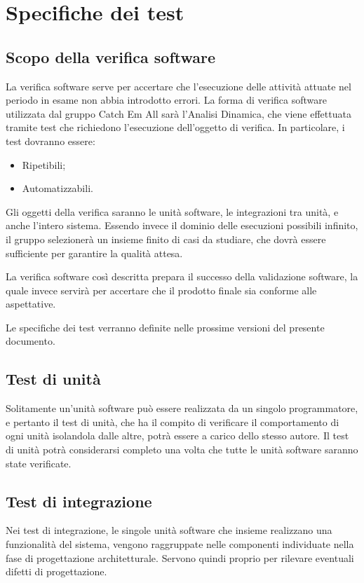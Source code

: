 \section{Specifiche dei test}

\subsection{Scopo della verifica software}
La verifica software serve per accertare che l'esecuzione delle attività attuate nel periodo in esame non abbia introdotto errori. La forma di verifica software utilizzata dal gruppo Catch Em All sarà l'Analisi Dinamica, che viene effettuata tramite test che richiedono l'esecuzione dell'oggetto di verifica. In particolare, i test dovranno essere:
\begin{itemize}
	\item Ripetibili;
	\item Automatizzabili.
\end{itemize}

Gli oggetti della verifica saranno le unità software, le integrazioni tra unità, e anche l'intero sistema. Essendo invece il dominio delle esecuzioni possibili infinito, il gruppo selezionerà un insieme finito di casi da studiare, che dovrà essere sufficiente per garantire la qualità attesa.

La verifica software così descritta prepara il successo della validazione software, la quale invece servirà per accertare che il prodotto finale sia conforme alle aspettative.

Le specifiche dei test verranno definite nelle prossime versioni del presente documento.

\subsection{Test di unità}
Solitamente un'unità software può essere realizzata da un singolo programmatore, e pertanto il test di unità, che ha il compito di verificare il comportamento di ogni unità isolandola dalle altre, potrà essere a carico dello stesso autore. Il test di unità potrà considerarsi completo una volta che tutte le unità software saranno state verificate.

\subsection{Test di integrazione}
Nei test di integrazione, le singole unità software che insieme realizzano una funzionalità del sistema, vengono raggruppate nelle componenti individuate nella fase di progettazione architetturale. Servono quindi proprio per rilevare eventuali difetti di progettazione.

